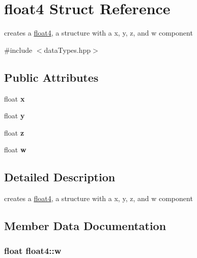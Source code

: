 \hypertarget{structfloat4}{}\section{float4 Struct Reference}
\label{structfloat4}


creates a \hyperlink{structfloat4}{float4}, a structure with a x, y, z, and w component  




{\ttfamily \#include $<$data\+Types.\+hpp$>$}

\subsection*{Public Attributes}
\begin{DoxyCompactItemize}
\item 
\hypertarget{structfloat4_ab60e7164162636ef8d0315cf18269b0f}{}float {\bfseries x}\label{structfloat4_ab60e7164162636ef8d0315cf18269b0f}

\item 
\hypertarget{structfloat4_a72bce4984c96cef3d6a50adcbce6e388}{}float {\bfseries y}\label{structfloat4_a72bce4984c96cef3d6a50adcbce6e388}

\item 
\hypertarget{structfloat4_a898443ac0132ee9f149661c63882361b}{}float {\bfseries z}\label{structfloat4_a898443ac0132ee9f149661c63882361b}

\item 
\hypertarget{structfloat4_ae3ef7af10eec7945566a363866321e26}{}float {\bfseries w}\label{structfloat4_ae3ef7af10eec7945566a363866321e26}

\end{DoxyCompactItemize}


\subsection{Detailed Description}
creates a \hyperlink{structfloat4}{float4}, a structure with a x, y, z, and w component 

\subsection{Member Data Documentation}
\hypertarget{structfloat4_ae3ef7af10eec7945566a363866321e26}{}
\subsubsection[{w}]{\setlength{\rightskip}{0pt plus 5cm}float float4\+::w}\label{structfloat4_ae3ef7af10eec7945566a363866321e26}
\hypertarget{structfloat4_ab60e7164162636ef8d0315cf18269b0f}{}
